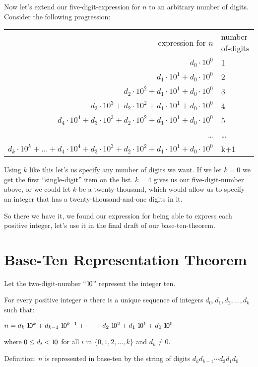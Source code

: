 \documentclass{article}
\newenvironment{jprIn}{\begin{adjustwidth}{2em}{}}{\end{adjustwidth}}
\begin{document}
\break
Now let's extend
our five-digit-expression for $n$ to an arbitrary
number of digits.
Consider the following progression:
\begin{center}
\begin{tabular}{r l}
expression for $n$ & number-of-digits\\
$d_0{\cdot}10^0$ & 1\\
$d_1{\cdot}10^1+d_0{\cdot}10^0$ & 2\\
$d_2{\cdot}10^2+d_1{\cdot}10^1+d_0{\cdot}10^0$ & 3\\
$d_3{\cdot}10^3+d_2{\cdot}10^2+d_1{\cdot}10^1+d_0{\cdot}10^0$ & 4\\
$d_4{\cdot}10^4+d_3{\cdot}10^3+d_2{\cdot}10^2+d_1{\cdot}10^1+d_0{\cdot}10^0$ & 5\\
\dots{} & \dots{}\\
$d_k{\cdot}10^k+\dots{}+d_4{\cdot}10^4+d_3{\cdot}10^3+d_2{\cdot}10^2+d_1{\cdot}10^1+d_0{\cdot}10^0$ & k+1
\end{tabular}
\end{center}
Using $k$ like this let's us specify any number of digits we want.
If we let $k=0$ we get the first ``single-digit'' 
item on the list.  $k=4$ gives us our five-digit-number above,
or we could let $k$ be a twenty-thousand, which would allow
us to specify an integer that has a twenty-thousand-and-one
digits in it.

So there we have it, we found our expression for being able to
express each positive integer, let's use
it in the final draft of our base-ten-theorem.

\section*{Base-Ten Representation Theorem}
\begin{jprIn}
Let the two-digit-number ``${1\hspace{-0.12em}0}$'' represent the integer ten.

For every positive integer $n$ there is a unique
sequence of integers $d_0, d_1, d_2,\dots{},d_k$ such that:

\hspace{3em}$n
=d_k{\cdot}{1\hspace{-0.12em}0}^k
+d_{k-1}{\cdot}{1\hspace{-0.12em}0}^{k-1}
+\dots
+d_2{\cdot}{1\hspace{-0.12em}0}^2
+d_1{\cdot}{1\hspace{-0.12em}0}^1
+d_0{\cdot}{1\hspace{-0.12em}0}^0$

where $0\le{}d_i<{1\hspace{-0.12em}0}$ for all $i$ in $\{0,1,2,\dots{},k\}$ and $d_k\ne0$.

Definition: $n$ is represented in base-ten by the string of digits $d_kd_{k-1}{\cdots}d_2d_1d_0$
\end{jprIn}
\end{document}
